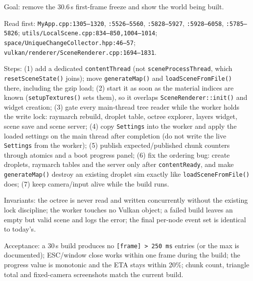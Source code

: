 \documentclass[11pt,a4paper]{article}
\begin{document}
\begin{tcolorbox}[promptbox={Prompt 2 --- Background content build and live progress}]
Goal: remove the 30.6\,s first-frame freeze and show the world being built.

Read first: \texttt{MyApp.cpp:1305--1320}, \texttt{:5526--5560},
\texttt{:5828--5927}, \texttt{:5928--6058}, \texttt{:5785--5826};
\texttt{utils/\allowbreak LocalScene.cpp:834--850,1004--1014};
\texttt{space/\allowbreak UniqueChangeCollector.hpp:46--57};
\texttt{vulkan/\allowbreak renderer/\allowbreak SceneRenderer.cpp:1694--1831}.

Steps: (1) add a dedicated \texttt{contentThread} (not
\texttt{sceneProcessThread}, which \texttt{resetSceneState()} joins); move
\texttt{generateMap()} and \texttt{loadSceneFromFile()} there, including the
gzip load; (2) start it as soon as the material indices are known
(\texttt{setupTextures()} sets them), so it overlaps
\texttt{SceneRenderer::init()} and widget creation; (3) gate every main-thread
tree reader while the worker holds the write lock: raymarch rebuild, droplet
table, octree explorer, layers widget, scene save and scene server; (4) copy
\texttt{Settings} into the worker and apply the loaded settings on the main
thread after completion (do not write the live \texttt{Settings} from the
worker); (5) publish expected/published chunk counters through atomics and a
boot progress panel; (6) fix the ordering bug: create droplets, raymarch
tables and the server only after \texttt{contentReady}, and make
\texttt{generateMap()} destroy an existing droplet sim exactly like
\texttt{loadSceneFromFile()} does; (7) keep camera/input alive while the
build runs.

Invariants: the octree is never read and written concurrently without the
existing lock discipline; the worker touches no Vulkan object; a failed
build leaves an empty but valid scene and logs the error; the final per-node
event set is identical to today's.

Acceptance: a 30\,s build produces no \texttt{[frame] > 250\,ms} entries
(or the max is documented); ESC/window close works within one frame during
the build; the progress value is monotonic and the ETA stays within 20\%;
chunk count, triangle total and fixed-camera screenshots match the current
build.
\end{tcolorbox}
\end{document}
